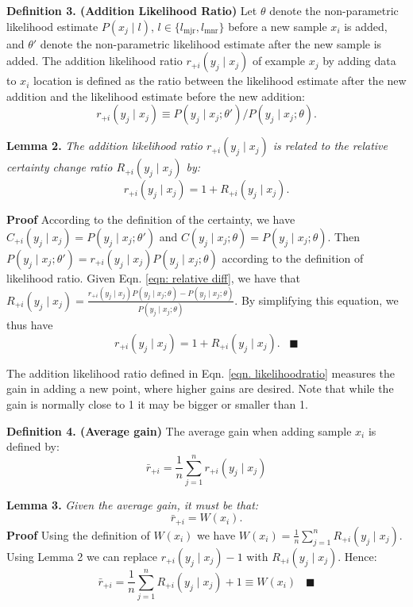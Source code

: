\documentclass{iitthesis}
\begin{document}
\noindent\textbf{Definition 3. (Addition Likelihood Ratio)} Let $\theta$ denote the non-parametric likelihood estimate $P(x_j\mid l)$, $l\in \{l_{\mbox{mjr}}, l_{\mbox{mnr}}\}$ before a new sample $x_i$ is added, and $\theta'$ denote the non-parametric likelihood estimate after the new sample is added. The addition likelihood ratio $r_{+i}(y_j\mid x_j)$ of example $x_j$ by adding data to $x_i$ location is defined as the ratio between the likelihood estimate after the new addition and the likelihood estimate before the new addition: 
\begin{equation}
r_{+i}(y_j\mid x_j) \equiv P(y_j\mid x_j ; \theta') / P(y_j\mid x_j; \theta).
\label{eqn. likelihoodratio}
\end{equation}

\noindent \textbf{Lemma 2.} \textit{The addition likelihood ratio $r_{+i}(y_j\mid x_j)$ is related to the relative certainty change ratio $R_{+i}(y_j\mid x_j)$ by: }
\begin{equation}
r_{+i}(y_j\mid x_j)=1+R_{+i}(y_j\mid x_j).
\end{equation}

\noindent\textbf{Proof} According to the definition of the certainty, we have $C_{+i}(y_j\mid x_j)=P(y_j\mid x_j; \theta')$ and $C(y_j\mid x_j; \theta)=P(y_j\mid x_j; \theta)$. Then $P(y_j\mid x_j; \theta')=r_{+i}(y_j\mid x_j) P(y_j\mid x_j; \theta)$ according to the definition of likelihood ratio. Given Eqn. \ref{eqn: relative diff}, we have that $R_{+i}(y_j\mid x_j)=\frac{r_{+i}(y_j\mid x_j) P(y_j \mid x_j; \theta) - P(y_j \mid x_j; \theta)}{P(y_j \mid x_j; \theta)}$.  By simplifying this equation, we thus have 
\begin{equation}
r_{+i}(y_j\mid x_j)=1+R_{+i}(y_j\mid x_j). \;\;\;\blacksquare
\end{equation}

The addition likelihood ratio defined in Eqn. \ref{eqn. likelihoodratio} measures the gain in adding a new point, where higher gains are desired. Note that while the gain is normally close to 1 it may be bigger or smaller than 1.

\noindent\textbf{Definition 4. (Average gain)} The average gain when adding sample $x_i$ is defined by:
\begin{equation}
\bar{r}_{+i}=\frac{1}{n} \sum_{j=1}^n r_{+i}(y_j\mid x_j)
\end{equation}

\noindent\textbf{Lemma 3.} \textit{Given the average gain, it must be that:}
\begin{equation}
\bar{r}_{+i}=W(x_i).
\end{equation}
\noindent\textbf{Proof} Using the definition of $W(x_i)$ we have $W(x_i)=\frac{1}{n}\sum_{j=1}^n R_{+i}(y_j\mid x_j)$. Using Lemma 2 we can replace $r_{+i}(y_j \mid x_j)-1$ with $R_{+i}(y_j \mid x_j)$. Hence:
\begin{equation}
\bar{r}_{+i}=\frac{1}{n}\sum_{j=1}^n R_{+i}(y_j \mid x_j) + 1\equiv W(x_i) \;\;\;\blacksquare
\end{equation}
\end{document}
